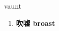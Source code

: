 
\begin{frame}
{\huge vaunt}
\begin{center}
\begin{enumerate}\Large
  \item \textbf{吹嘘 broast}
\end{enumerate}
\end{center}
\end{frame}
